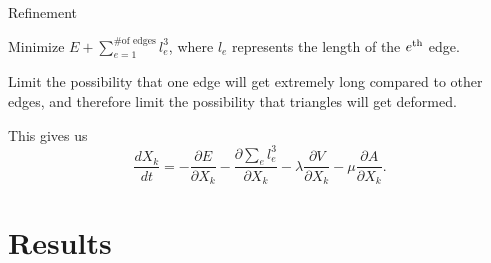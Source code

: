 \documentclass[10pt]{beamer}
\newcommand\nth{\textsuperscript{th}\xspace}
\begin{document}
\begin{frame}{Refinement}

Minimize $E + \sum_{e=1}^{\text{\# of edges}}l_{e}^3$, where $l_{e}$ represents the length of the $e\nth$ edge.

\vspace{5mm}

Limit the possibility that one edge will get extremely long compared to other edges, and therefore limit the possibility that triangles will get deformed.

\vspace{5mm}

This gives us
\begin{equation}
\frac{dX_{k}}{dt} = - \frac{\partial E}{\partial X_{k}} - \frac{\partial \sum_{e} l_{e}^3 }{\partial X_{k}} - \lambda \frac{\partial V}{\partial X_{k}} - \mu \frac{\partial A}{\partial X_{k}}. \nonumber
\end{equation}


\end{frame}

\section{Results}
\end{document}
